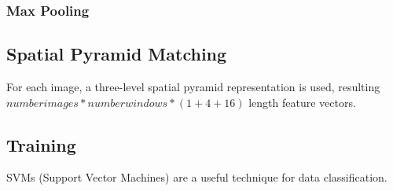 \subsubsection{Max Pooling}

\subsection{Spatial Pyramid Matching}
For each image, a three-level spatial pyramid representation is used, resulting
$number images * number windows * (1 + 4 + 16)$ length feature vectors.

\subsection{Training}
SVMs (Support Vector Machines) are a useful technique for data classification.

